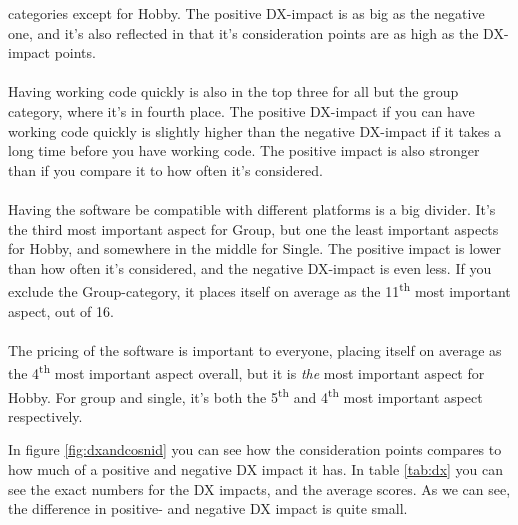 \documentclass{article}
\begin{document}
categories except for Hobby. The positive DX-impact is as big as the
negative one, and it's also reflected in that it's consideration points
are as high as the DX-impact points.
\\ \\
Having working code quickly is also in the top three for all but the
group category, where it's in fourth place. The positive DX-impact if
you can have working code quickly is slightly higher than the negative
DX-impact if it takes a long time before you have working code. The
positive impact is also stronger than if you compare it to how often
it's considered.
\\ \\
Having the software be compatible with different platforms is a big
divider. It's the third most important aspect for Group, but one the
least important aspects for Hobby, and somewhere in the middle for
Single. The positive impact is lower than how often it's considered, and
the negative DX-impact is even less. If you exclude the Group-category,
it places itself on average as the 11\textsuperscript{th} most important
aspect, out of 16.
\\ \\
The pricing of the software is important to everyone, placing itself on
average as the 4\textsuperscript{th} most important aspect overall, but it is \textit{the}
most important aspect for Hobby. For group and single, it's both the
5\textsuperscript{th}  and 4\textsuperscript{th}  most important aspect respectively.

In figure \ref{fig:dxandcosnid} you can see how the consideration points compares to how much of a positive and negative DX impact it has. In table \ref{tab:dx} you can see the exact numbers for the DX impacts, and the average scores. As we can see, the difference in positive- and negative DX impact is quite small.\\ \\
\end{document}

